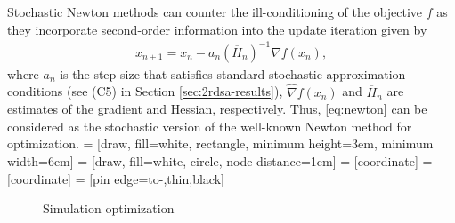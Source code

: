 \documentclass[letterpaper, 10 pt, conference]{ieeeconf}  %
\begin{document}
Stochastic Newton methods can counter the ill-conditioning of the objective $f$ as they incorporate second-order information into the update iteration given by   
\begin{align}
\label{eq:newton}
x_{n+1} = x_n - a_n (\overline H_n)^{-1}\widehat\nabla f(x_n), 
\end{align}
where $a_n$ is the step-size that satisfies standard stochastic approximation conditions (see (C5) in Section \ref{sec:2rdsa-results}), $\widehat\nabla f(x_n)$ and $\overline H_n$ are estimates of the gradient and Hessian, respectively. Thus, \eqref{eq:newton} can be considered as  the stochastic version of the well-known Newton method for optimization. 
 = [draw, fill=white, rectangle,
   minimum height=3em, minimum width=6em]
 = [draw, fill=white, circle, node distance=1cm]
 = [coordinate]
 = [coordinate]
 = [pin edge={to-,thin,black}]

 \begin{figure}[t]
    \centering
{}
\caption{Simulation optimization}
\label{fig:so}
\end{figure}
\end{document}
